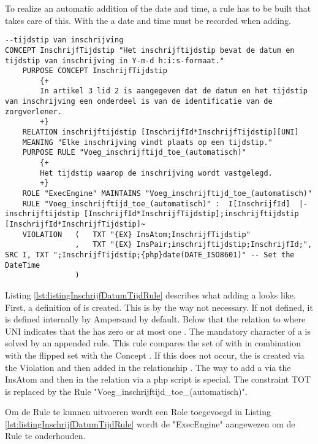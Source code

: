 To realize an automatic addition of the date and time, a rule has to be built that takes care of this.
With the  a date and time must be recorded when adding.
\begin{lstlisting}[caption=Inschrijving.adl Concept en Rule, numbers=none, label={lst:listingInschrijfDatumTijdRule}]
--tijdstip van inschrijving
CONCEPT InschrijfTijdstip "Het inschrijftijdstip bevat de datum en tijdstip van inschrijving in Y-m-d h:i:s-formaat."
    PURPOSE CONCEPT InschrijfTijdstip
        {+
        In artikel 3 lid 2 is aangegeven dat de datum en het tijdstip van inschrijving een onderdeel is van de identificatie van de zorgverlener.
        +}
    RELATION inschrijftijdstip [InschrijfId*InschrijfTijdstip][UNI]
    MEANING "Elke inschrijving vindt plaats op een tijdstip."
    PURPOSE RULE "Voeg_inschrijftijd_toe_(automatisch)"
        {+
        Het tijdstip waarop de inschrijving wordt vastgelegd.
        +}
    ROLE "ExecEngine" MAINTAINS "Voeg_inschrijftijd_toe_(automatisch)"
    RULE "Voeg_inschrijftijd_toe_(automatisch)" :  I[InschrijfId]  |-  inschrijftijdstip [InschrijfId*InschrijfTijdstip];inschrijftijdstip [InschrijfId*InschrijfTijdstip]~
    VIOLATION   (   TXT "{EX} InsAtom;InschrijfTijdstip"
                ,   TXT "{EX} InsPair;inschrijftijdstip;InschrijfId;", SRC I, TXT ";InschrijfTijdstip;{php}date(DATE_ISO8601)" -- Set the DateTime
                )
\end{lstlisting}
Listing \ref{lst:listingInschrijfDatumTijdRule} describes what adding a  looks like.
First, a definition of  is created.
This is by the way not necessary.
If not defined, it is defined internally by Ampersand by default.
Below that the relation to  where UNI indicates that the  has zero or at most one .
The mandatory character of a  is solved by an appended rule.
This rule compares the set of  with  in combination with the flipped set with the Concept .
If this does not occur, the  is created via the Violation and then added in the relationship .
The way to add a  via the InsAtom and then in the relation via a php script is special.
The constraint TOT is replaced by the Rule "Voeg\_inschrijftijd\_toe\_(automatisch)".

Om de Rule te kunnen uitvoeren wordt een Role toegevoegd in Listing \ref{lst:listingInschrijfDatumTijdRule} wordt de "ExecEngine" aangewezen om de Rule te onderhouden.

